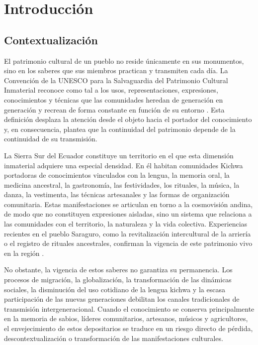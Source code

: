\chapter{Introducción}
\label{chap:introduccion}

\section{Contextualización}
El patrimonio cultural de un pueblo no reside únicamente en sus monumentos, sino en los saberes que sus miembros practican y transmiten cada día. La Convención de la UNESCO para la Salvaguardia del Patrimonio Cultural Inmaterial reconoce como tal a los usos, representaciones, expresiones, conocimientos y técnicas que las comunidades heredan de generación en generación y recrean de forma constante en función de su entorno \cite{unesco2003convencion}. Esta definición desplaza la atención desde el objeto hacia el portador del conocimiento y, en consecuencia, plantea que la continuidad del patrimonio depende de la continuidad de su transmisión.

La Sierra Sur del Ecuador constituye un territorio en el que esta dimensión inmaterial adquiere una especial densidad. En él habitan comunidades Kichwa portadoras de conocimientos vinculados con la lengua, la memoria oral, la medicina ancestral, la gastronomía, las festividades, los rituales, la música, la danza, la vestimenta, las técnicas artesanales y las formas de organización comunitaria. Estas manifestaciones se articulan en torno a la cosmovisión andina, de modo que no constituyen expresiones aisladas, sino un sistema que relaciona a las comunidades con el territorio, la naturaleza y la vida colectiva. Experiencias recientes en el pueblo Saraguro, como la revitalización intercultural de la arriería o el registro de rituales ancestrales, confirman la vigencia de este patrimonio vivo en la región \cite{quezada2026muleteering,torres2022ancestral}.

No obstante, la vigencia de estos saberes no garantiza su permanencia. Los procesos de migración, la globalización, la transformación de las dinámicas sociales, la disminución del uso cotidiano de la lengua kichwa y la escasa participación de las nuevas generaciones debilitan los canales tradicionales de transmisión intergeneracional. Cuando el conocimiento se conserva principalmente en la memoria de sabios, líderes comunitarios, artesanos, músicos y agricultores, el envejecimiento de estos depositarios se traduce en un riesgo directo de pérdida, descontextualización o transformación de las manifestaciones culturales.

